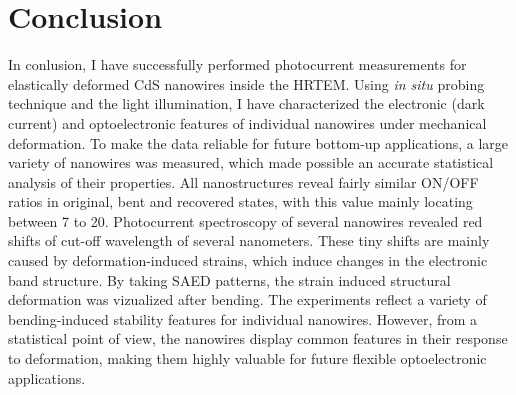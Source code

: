 \section{Conclusion}
In conlusion, I have successfully performed photocurrent measurements for elastically deformed CdS nanowires inside the HRTEM. Using {\em in situ}  probing technique and the light illumination, I have characterized the electronic (dark current) and optoelectronic features of individual nanowires under mechanical deformation. 
To make the data reliable for future bottom-up applications, a large variety of nanowires was measured, which made possible an accurate statistical analysis of their properties. 
All nanostructures reveal fairly similar ON/OFF ratios in original, bent and recovered states, with this value mainly locating between 7 to 20. 
Photocurrent spectroscopy of several nanowires revealed red shifts of cut-off wavelength of several nanometers. 
These tiny shifts are mainly caused by deformation-induced strains, which induce changes in the electronic band structure. 
By taking SAED patterns, the strain induced structural deformation was vizualized after bending. 
The experiments reflect a variety of bending-induced stability features for individual nanowires. However, from a statistical point of view, the nanowires display common features in their response to deformation, making them highly valuable for future flexible optoelectronic applications. 

